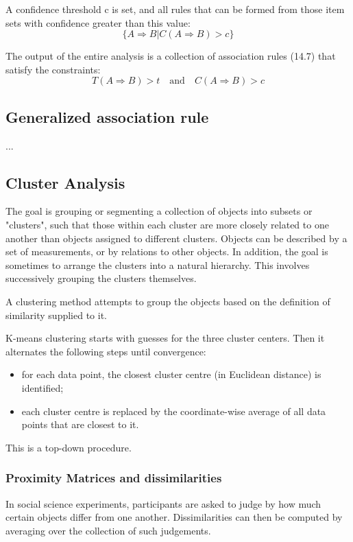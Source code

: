 A confidence threshold c is set, and all rules that can be formed from those item sets with confidence greater than this value:
\begin{equation}
\{ A\Rightarrow B| C(A\Rightarrow B)>c\}
\end{equation}


The output of the entire analysis is a collection of association rules (14.7) that satisfy the constraints:
\begin{equation}
T(A \Rightarrow B) >t \quad \text{and}\quad C(A \Rightarrow B)>c
\end{equation}

\subsection{Generalized association rule}
...

\subsection{Cluster Analysis}
The goal is grouping or segmenting a collection of objects into subsets or "clusters", such that those within each cluster are more closely related to one another than objects assigned to different clusters. Objects can be described by a set of measurements, or by relations to other objects. In addition, the goal is sometimes to arrange the clusters into a natural hierarchy. This involves successively grouping the clusters themselves.

A clustering method attempts to group the objects based on the definition of similarity supplied to it.

K-means clustering starts with guesses for the three cluster centers. Then it alternates the following steps until convergence:
\begin{itemize}
\item  for each data point, the closest cluster centre (in Euclidean distance) is identified;
\item each cluster centre is replaced by the coordinate-wise average of all data points that are closest to it.
\end{itemize}

This is a top-down procedure.

\subsubsection{Proximity Matrices and dissimilarities}
In social science experiments, participants are asked to judge by how much certain objects differ from one another. Dissimilarities can then be computed by averaging over the collection of such judgements.

